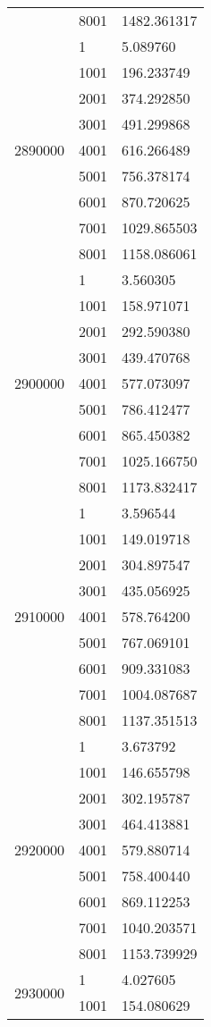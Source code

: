 \begin{table}[htb!]
\begin{tabular}{lll}
 & 8001 & 1482.361317 \\
\multirow[c]{9}{*}{2890000} & 1 & 5.089760 \\
 & 1001 & 196.233749 \\
 & 2001 & 374.292850 \\
 & 3001 & 491.299868 \\
 & 4001 & 616.266489 \\
 & 5001 & 756.378174 \\
 & 6001 & 870.720625 \\
 & 7001 & 1029.865503 \\
 & 8001 & 1158.086061 \\
\multirow[c]{9}{*}{2900000} & 1 & 3.560305 \\
 & 1001 & 158.971071 \\
 & 2001 & 292.590380 \\
 & 3001 & 439.470768 \\
 & 4001 & 577.073097 \\
 & 5001 & 786.412477 \\
 & 6001 & 865.450382 \\
 & 7001 & 1025.166750 \\
 & 8001 & 1173.832417 \\
\multirow[c]{9}{*}{2910000} & 1 & 3.596544 \\
 & 1001 & 149.019718 \\
 & 2001 & 304.897547 \\
 & 3001 & 435.056925 \\
 & 4001 & 578.764200 \\
 & 5001 & 767.069101 \\
 & 6001 & 909.331083 \\
 & 7001 & 1004.087687 \\
 & 8001 & 1137.351513 \\
\multirow[c]{9}{*}{2920000} & 1 & 3.673792 \\
 & 1001 & 146.655798 \\
 & 2001 & 302.195787 \\
 & 3001 & 464.413881 \\
 & 4001 & 579.880714 \\
 & 5001 & 758.400440 \\
 & 6001 & 869.112253 \\
 & 7001 & 1040.203571 \\
 & 8001 & 1153.739929 \\
\multirow[c]{9}{*}{2930000} & 1 & 4.027605 \\
 & 1001 & 154.080629 \\

\end{tabular}
\end{table}
